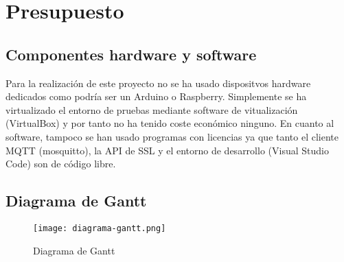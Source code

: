 \chapter{Presupuesto}
\label{chap:presupuesto}

\section{Componentes hardware y software}

Para la realización de este proyecto no se ha usado dispositvos hardware dedicados como podría ser un Arduino o Raspberry.
Simplemente se ha virtualizado el entorno de pruebas mediante software de vitualización (VirtualBox) y por tanto no ha tenido
coste económico ninguno. En cuanto al software, tampoco se han usado programas con licencias ya que tanto el cliente MQTT 
(mosquitto), la API de SSL y el entorno de desarrollo (Visual Studio Code) son de código libre.

\section{Diagrama de Gantt}

\begin{figure}[H]
    \centering
    \texttt{[image: diagrama-gantt.png]}
    \caption{Diagrama de Gantt}
\end{figure}
